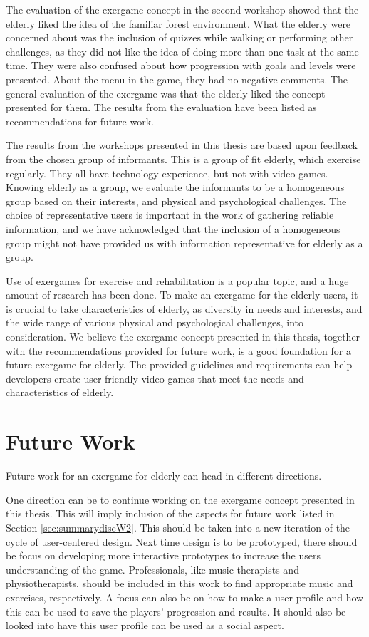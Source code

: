 The evaluation of the exergame concept in the second workshop showed that the elderly liked the idea of the familiar forest environment. What the elderly were concerned about was the inclusion of quizzes while walking or performing other challenges, as they did not like the idea of doing more than one task at the same time. They were also confused about how progression with goals and levels were presented. About the menu in the game, they had no negative comments. The general evaluation of the exergame was that the elderly liked the concept presented for them. The results from the evaluation have been listed as recommendations for future work. 

The results from the workshops presented in this thesis are based upon feedback from the chosen group of informants. This is a group of fit elderly, which exercise regularly. They all have technology experience, but not with video games. Knowing elderly as a group, we evaluate the informants to be a homogeneous group based on their interests, and physical and psychological challenges. The choice of representative users is important in the work of gathering reliable information, and we have acknowledged that the inclusion of a homogeneous group might not have provided us with information representative for elderly as a group. 

Use of exergames for exercise and rehabilitation is a popular topic, and a huge amount of research has been done. To make an exergame for the elderly users, it is crucial to take characteristics of elderly, as diversity in needs and interests, and the wide range of various physical and psychological challenges, into consideration. We believe the exergame concept presented in this thesis, together with the recommendations provided for future work, is a good foundation for a future exergame for elderly. The provided guidelines and requirements can help developers create user-friendly video games that meet the needs and characteristics of elderly.
 
\section{Future Work}

Future work for an exergame for elderly can head in different directions. 

One direction can be to continue working on the exergame concept presented in this thesis. This will imply inclusion of the aspects for future work listed in Section \ref{sec:summarydiscW2}. This should be taken into a new iteration of the cycle of user-centered design. Next time design is to be prototyped, there should be focus on developing more interactive prototypes to increase the users understanding of the game. Professionals, like music therapists and physiotherapists, should be included in this work to find appropriate music and exercises, respectively. A focus can also be on how to make a user-profile and how this can be used to save the players' progression and results. It should also be looked into have this user profile can be used as a social aspect.

